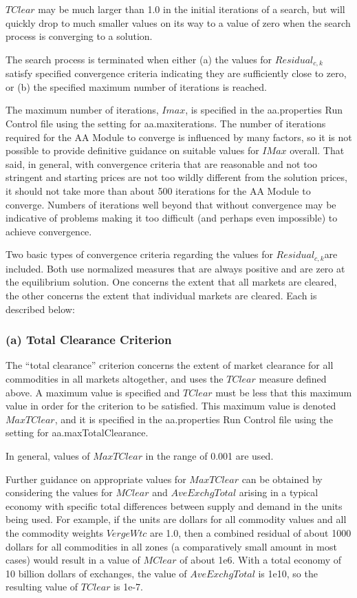 $TClear$ may be much larger than 1.0 in the initial iterations of a search, but will quickly drop to much smaller values on its way to a value of zero when the search process is converging to a solution.

The search process is terminated when either (a) the values for $Residual_{c,k}$ satisfy specified convergence criteria indicating they are sufficiently close to zero, or (b) the specified maximum number of iterations is reached.

The maximum number of iterations, $Imax$, is specified in the aa.properties Run Control file using the setting for aa.maxiterations. The number of iterations required for the AA Module to converge is influenced by many factors, so it is not possible to provide definitive guidance on suitable values for $IMax$ overall. That said, in general, with convergence criteria that are reasonable and not too stringent and starting prices are not too wildly different from the solution prices, it should not take more than about 500 iterations for the AA Module to converge. Numbers of iterations well beyond that without convergence may be indicative of problems making it too difficult (and perhaps even impossible) to achieve convergence.

Two basic types of convergence criteria regarding the values for $Residual_{c,k}$are included. Both use normalized measures that are always positive and are zero at the equilibrium solution. One concerns the extent that all markets are cleared, the other concerns the extent that individual markets are cleared. Each is described below:

\subsubsection{(a) Total Clearance Criterion}
The ``total clearance'' criterion concerns the extent of market clearance for all commodities in all markets altogether, and uses the $TClear$ measure defined above. A maximum value is specified and $TClear$ must be less that this maximum value in order for the criterion to be satisfied. This maximum value is denoted $MaxTClear$, and it is specified in the aa.properties Run Control file using the setting for aa.maxTotalClearance.

In general, values of $MaxTClear$ in the range of 0.001 are used.

Further guidance on appropriate values for $MaxTClear$ can be obtained by considering the values for $MClear$ and $AveExchgTotal$ arising in a typical economy with specific total differences between supply and demand in the units being used. For example, if the units are dollars for all commodity values and all the commodity weights $VergeWtc$ are 1.0, then a combined residual of about 1000 dollars for all commodities in all zones (a comparatively small amount in most cases) would result in a value of $MClear$ of about 1e6. With a total economy of 10 billion dollars of exchanges, the value of $AveExchgTotal$ is 1e10, so the resulting value of $TClear$ is 1e-7.

